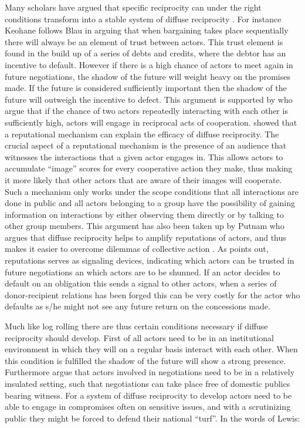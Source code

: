 Many scholars have argued that specific reciprocity can under the right conditions transform into a stable system of diffuse reciprocity \citep{Gouldner1960,Axelrod1986,Keohane1986,NowakSigmund1998,Diekmann2004}. For instance Keohane follows Blau in arguing that when bargaining takes place sequentially there will always be an element of trust between actors. This trust element is found in the build up of a series of debts and credits, where the debtor has an incentive to default. However if there is a high chance of actors to meet again in future negotiations, the shadow of the future will weight heavy on the promises made. If the future is considered sufficiently important then the shadow of the future will outweigh the incentive to defect. This argument is supported by \citet{FehrFischbacherGachter2002} who argue that if the chance of two actors repeatedly interacting with each other is sufficiently high, actors will engage in reciprocal acts of cooperation. \citet{NowakSigmund1998} showed that a reputational mechanism can explain the efficacy of diffuse reciprocity. The crucial aspect of a reputational mechanism is the presence of an audience that witnesses the interactions that a given actor engages in. This allows actors to accumulate ``image'' scores for every cooperative action they make, thus making it more likely that other actors that are aware of their images will cooperate. Such a mechanism only works under the scope conditions that all interactions are done in public and all actors belonging to a group  have the possibility of gaining information on interactions by either observing them directly or by talking to other group members. This argument has also been taken up by Putnam who argues that diffuse reciprocity helps to amplify reputations of actors, and thus makes it easier to overcome dilemmas of collective action \citep{Putnam1995}. As \citet{Axelrod1986} points out, reputations serves as signaling devices, indicating which actors can be trusted in future negotiations an which actors are to be shunned. If an actor decides to default on an obligation this sends a signal to other actors, when a series of donor-recipient relations has been forged this can be very costly for the actor who defaults as s/he might not see any future return on the concessions made.    

Much like log rolling there are thus certain conditions necessary if diffuse reciprocity should develop. First of all actors need to be in an institutional environment in which they will on a regular basis interact with each other. When this condition is fulfilled the shadow of the future will show a strong presence. Furthermore \citet{Lewis2005} argue that actors involved in negotiations need to be in a relatively insulated setting, such that negotiations can take place free of domestic publics bearing witness. For a system of diffuse reciprocity to develop actors need to be able to engage in compromises often on sensitive issues, and with a scrutinizing public they might be forced to defend their national ``turf''. In the words of Lewis:

